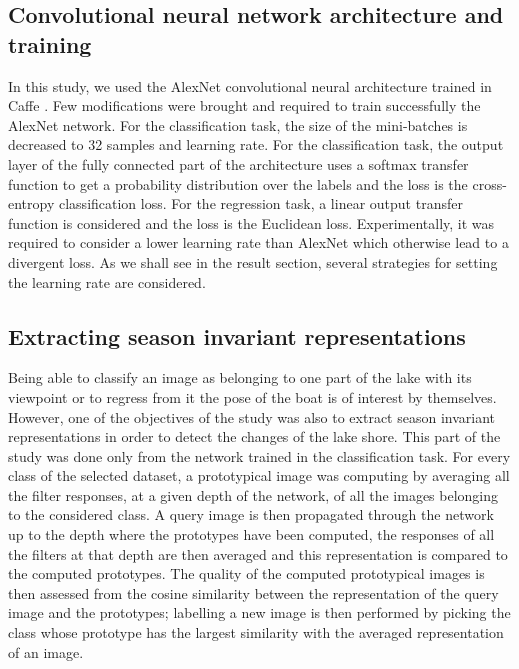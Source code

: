 \subsection{Convolutional neural network architecture and training}

In this study, we used the AlexNet convolutional neural architecture \cite{NIPS2012_4824} trained in Caffe \cite{jia2014caffe}. Few modifications were brought and required to train successfully the AlexNet network. For the classification task, the size of the mini-batches is decreased to 32 samples and learning rate. For the classification task, the output layer of the fully connected part of the architecture uses a softmax transfer function to get a probability distribution over the labels and the loss is the cross-entropy classification loss. For the regression task, a linear output transfer function is considered and the loss is the Euclidean loss. Experimentally, it was required to consider a lower learning rate than AlexNet which otherwise lead to a divergent loss. As we shall see in the result section, several strategies for setting the learning rate are considered.


\subsection{Extracting season invariant representations}

Being able to classify an image as belonging to one part of the lake with its viewpoint or to regress from it the pose of the boat is of interest by themselves. However, one of the objectives of the study was also to extract season invariant representations in order to detect the changes of the lake shore. This part of the study was done only from the network trained in the classification task. For every class of the selected dataset, a prototypical image was computing by averaging all the filter responses, at a given depth of the network, of all the images belonging to the considered class. A query image is then propagated through the network up to the depth where the prototypes have been computed, the responses of all the filters at that depth are then averaged and this representation is compared to the computed prototypes. The quality of the computed prototypical images is then assessed from the cosine similarity between the representation of the query image and the prototypes; labelling a new image is then performed by picking the class whose prototype has the largest similarity with the averaged representation of an image.
